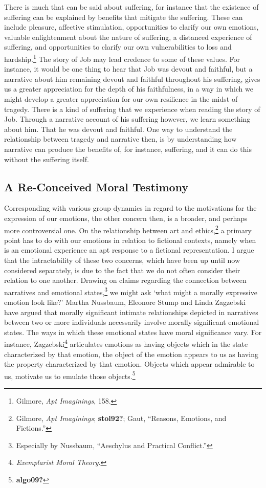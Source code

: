\documentclass[
  12pt,
]{book}
\theoremstyle{definition}
\theoremstyle{definition}
\theoremstyle{definition}
\theoremstyle{definition}
\theoremstyle{remark}
\begin{document}
There is much that can be said about suffering, for instance that the existence of suffering can be explained by benefits that mitigate the suffering. These can include pleasure, affective stimulation, opportunities to clarify our own emotions, valuable enlightenment about the nature of suffering, a distanced experience of suffering, and opportunities to clarify our own vulnerabilities to loss and hardship.\footnote{Gilmore, \emph{Apt {Imaginings}}, 158.} The story of Job may lead credence to some of these values. For instance, it would be one thing to hear that Job was devout and faithful, but a narrative about him remaining devout and faithful throughout his suffering, gives us a greater appreciation for the depth of his faithfulness, in a way in which we might develop a greater appreciation for our own resilience in the midst of tragedy. There is a kind of suffering that we experience when reading the story of Job. Through a narrative account of his suffering however, we learn something about him. That he was devout and faithful. One way to understand the relationship between tragedy and narrative then, is by understanding how narrative can produce the benefits of, for instance, suffering, and it can do this without the suffering itself.

\subsection*{A Re-Conceived Moral Testimony}\label{a-re-conceived-moral-testimony}

Corresponding with various group dynamics in regard to the motivations for the expression of our emotions, the other concern then, is a broader, and perhaps more controversial one. On the relationship between art and ethics,\footnote{Gilmore, \emph{Apt {Imaginings}}; \textbf{stol92?}; Gaut, {``Reasons, Emotions, and Fictions.''}} a primary point has to do with our emotions in relation to fictional contexts, namely when is an emotional experience an apt response to a fictional representation. I argue that the intractability of these two concerns, which have been up until now considered separately, is due to the fact that we do not often consider their relation to one another. Drawing on claims regarding the connection between narratives and emotional states,\footnote{Especially by Nussbaum, {``Aeschylus and Practical Conflict.''}} we might ask `what might a morally expressive emotion look like?' Martha Nussbaum, Eleonore Stump and Linda Zagzebski have argued that morally significant intimate relationships depicted in narratives between two or more individuals necessarily involve morally significant emotional states. The ways in which these emotional states have moral significance vary. For instance, Zagzebski\footnote{\emph{Exemplarist {Moral Theory}}.} articulates emotions as having objects which in the state characterized by that emotion, the object of the emotion appears to us as having the property characterized by that emotion. Objects which appear admirable to us, motivate us to emulate those objects.\footnote{\textbf{algo09?}}
\end{document}
